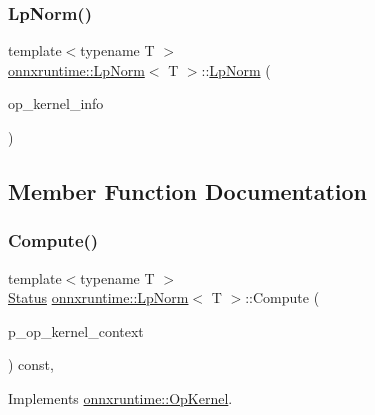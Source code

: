 \subsubsection{\texorpdfstring{Lp\+Norm()}{LpNorm()}}
{\footnotesize\ttfamily template$<$typename T $>$ \\
\mbox{\hyperlink{classonnxruntime_1_1LpNorm}{onnxruntime\+::\+Lp\+Norm}}$<$ T $>$\+::\mbox{\hyperlink{classonnxruntime_1_1LpNorm}{Lp\+Norm}} (\begin{DoxyParamCaption}\item[{const \mbox{\hyperlink{classonnxruntime_1_1OpKernelInfo}{Op\+Kernel\+Info}} \&}]{op\+\_\+kernel\+\_\+info }\end{DoxyParamCaption})\hspace{0.3cm}{\ttfamily [inline]}}



\subsection{Member Function Documentation}
\mbox{\label{classonnxruntime_1_1LpNorm_ac33db79168eb2c942307cf85b60f3fe3}} 
\subsubsection{\texorpdfstring{Compute()}{Compute()}\hspace{0.1cm}{\footnotesize\ttfamily [1/2]}}
{\footnotesize\ttfamily template$<$typename T $>$ \\
\mbox{\hyperlink{classonnxruntime_1_1common_1_1Status}{Status}} \mbox{\hyperlink{classonnxruntime_1_1LpNorm}{onnxruntime\+::\+Lp\+Norm}}$<$ T $>$\+::Compute (\begin{DoxyParamCaption}\item[{\mbox{\hyperlink{classonnxruntime_1_1OpKernelContext}{Op\+Kernel\+Context}} $\ast$}]{p\+\_\+op\+\_\+kernel\+\_\+context }\end{DoxyParamCaption}) const\hspace{0.3cm}{\ttfamily [override]}, {\ttfamily [virtual]}}



Implements \mbox{\hyperlink{classonnxruntime_1_1OpKernel_a9eca8656a78b1b3ab9d3351a12798650}{onnxruntime\+::\+Op\+Kernel}}.

